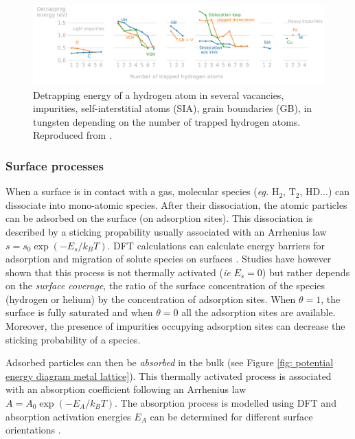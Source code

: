 \begin{figure}
    \centering
    \includegraphics[width=\linewidth]{Figures/Chapter1/trapping_energy_hydrogen_in_tungsten.pdf}
    \caption{Detrapping energy of a hydrogen atom in several vacancies, impurities, self-interstitial atoms (SIA), grain boundaries (GB), in tungsten depending on the number of trapped hydrogen atoms. Reproduced from \cite{hodille_study_2016}.}
    \label{fig: trapping energy hydrogen in tungsten}
\end{figure}

\subsubsection{Surface processes}

When a surface is in contact with a gas, molecular species (\textit{eg.} $\text{H}_2$, $\text{T}_2$, $\text{HD}$...) can dissociate into mono-atomic species.
After their dissociation, the atomic particles can be adsorbed on the surface (on adsorption sites).
This dissociation is described by a sticking propability usually associated with an Arrhenius law $s = s_0 \exp{(-E_s/k_B T)}$.
DFT calculations can calculate energy barriers for adsorption and migration of solute species on surfaces .
Studies have however shown that this process is not thermally activated (\textit{ie} $E_s=0$)  but rather depends on the \textit{surface coverage}, the ratio of the surface concentration of the species (hydrogen or helium) by the concentration of adsorption sites.
When $\theta = 1$, the surface is fully saturated and when $\theta = 0$ all the adsorption sites are available.
Moreover, the presence of impurities occupying adsorption sites can decrease the sticking probability of a species.

Adsorbed particles can then be \textit{absorbed} in the bulk (see Figure \ref{fig: potential energy diagram metal lattice}).
This thermally activated process is associated with an absorption coefficient following an Arrhenius law $A=A_0 \exp{(-E_A/k_B T)}$.
The absorption process is modelled using DFT and absorption activation energies $E_A$ can be determined for different surface orientations .

